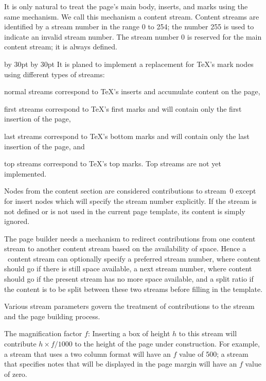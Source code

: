It is only natural to treat the page's main body,
inserts, and marks using the same mechanism. We call this
mechanism a content stream. 
Content streams are identified by a stream number in the range 0 to 254;
the number 255 is used to indicate an invalid stream number.
The stream number 0 is reserved for the main content stream; it is always defined.

\medskip
{\small \advance \leftskip by 30pt \advance \rightskip by 30pt 
It is planed to implement a replacement for \TeX's mark nodes using
different types of streams:
\itemize
\item normal streams correspond to \TeX's inserts and accumulate content on the page,
\item first streams correspond to \TeX's first marks and will contain only the first insertion of the page,
\item last streams correspond to \TeX's bottom marks and will contain only the last insertion of the page, and
\item top streams correspond to \TeX's top marks. Top streams are not yet implemented.
\enditemize
\medskip
}

Nodes from the content section are considered contributions to stream~0 except
for insert nodes which will specify the stream number explicitly. 
If the stream is not defined or is not used in the current page template, its content is simply ignored.

The page builder needs a mechanism to redirect contributions from one content
stream to another content stream based on the availability of space.
Hence a \HINT\ content stream can optionally specify a preferred stream number,
where content should go if there is still space available, a next stream number,
where content should go if the present stream has no more space available, and
a split ratio if the content is to be split between these two streams before
filling in the template.

Various stream parameters govern the treatment of contributions to the stream
and the page building process.

\itemize
\item The magnification factor $f$: Inserting a box of height $h$ to this stream will contribute $h\times f/1000$
to the height of the page under construction. For example, a stream
that uses a two column format will have an $f$ value of 500; a stream
that specifies notes that will be displayed in the page margin will
have an $f$ value of zero.

